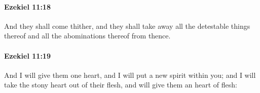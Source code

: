 		\paragraph{Ezekiel 11:18} %
			\label{EZEKIEL-11-18}

			And they shall come thither, and they shall take away all the detestable things thereof and all the abominations thereof from thence.


		\paragraph{Ezekiel 11:19} %
			\label{EZEKIEL-11-19}

			And I will give them one heart, and I will put a new spirit within you; and I will take the stony heart out of their flesh, and will give them an heart of flesh:


